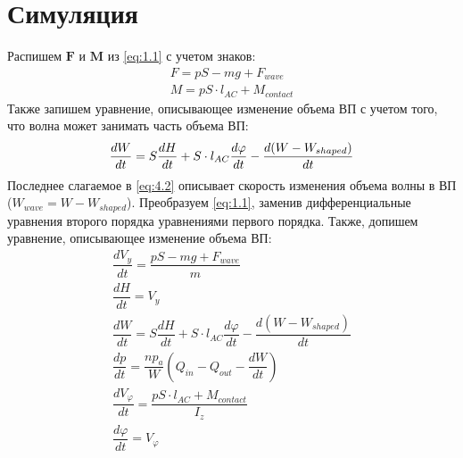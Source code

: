 \documentclass{article}%
\numberwithin{equation}{subsection}
\let\oldsection\section%
\renewcommand{\section}{%
  \renewcommand{\theequation}{\thesection.\arabic{equation}}%
  \oldsection}%
\begin{document}
\section{Симуляция}
Распишем $\mathbf{F}$ и $\mathbf{M}$ из \ref{eq:1.1} с учетом знаков:
\begin{equation}
\begin{gathered}
    F = pS - mg + F_{wave}\\
    M = pS\cdot l_{AC} + M_{contact}
\end{gathered}
\end{equation}
Также запишем уравнение, описывающее изменение объема ВП с учетом того, что волна может занимать часть объема ВП:
\begin{equation}
    \dfrac{dW}{dt}=S\dfrac{dH}{dt}+S\cdot l_{AC}\dfrac{d\varphi}{dt}-\dfrac{d(W-W_{shaped})}{dt}\\
    \label{eq:4.2}
\end{equation}
Последнее слагаемое в \ref{eq:4.2} описывает скорость изменения объема волны в ВП ($W_{wave} = W - W_{shaped}$).
\newline
Преобразуем \ref{eq:1.1}, заменив дифференциальные уравнения второго порядка уравнениями первого порядка. Также, допишем уравнение, описывающее изменение объема ВП:
\begin{equation}
\begin{gathered}
    \dfrac{dV_y}{dt}=\dfrac{pS-mg+F_{wave}}{m}\\
    \dfrac{dH}{dt} = V_y\\
    \dfrac{dW}{dt}=S\dfrac{dH}{dt}+S\cdot l_{AC}\dfrac{d\varphi}{dt}-\dfrac{d(W-W_{shaped})}{dt}\\
    \dfrac{dp}{dt}=\dfrac{np_a}{W}\left(Q_{in} - Q_{out} -\dfrac{dW}{dt}\right)\\
    \dfrac{dV_{\varphi}}{dt}=\dfrac{pS\cdot l_{AC} + M_{contact}}{I_z}\\
    \dfrac{d\varphi}{dt} = V_{\varphi}
\end{gathered}
\end{equation}
\end{document}

